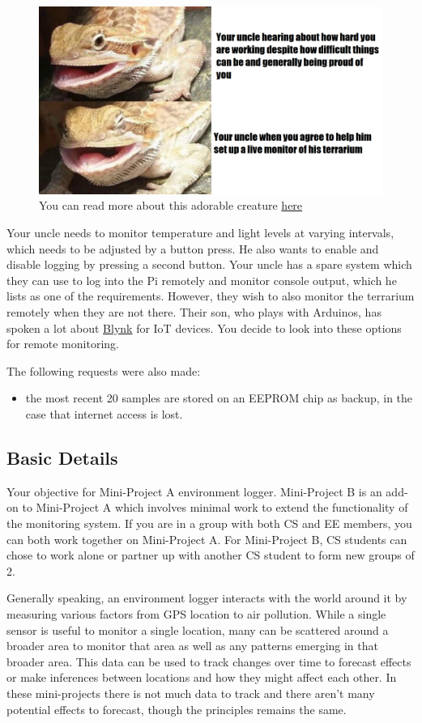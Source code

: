 \begin{figure}[H]
\centering
\includegraphics[width=0.7\columnwidth]{Figures/uncledragon.png}
\caption{You can read more about this adorable creature \href{https://knowyourmeme.com/memes/butter-the-bearded-dragon}{here}}
\label{ButterDragon}
\end{figure}

Your uncle needs to monitor temperature and light levels at varying intervals, which needs to be adjusted by a button press. He also wants to enable and disable logging by pressing a second button. Your uncle has a spare system which they can use to log into the Pi remotely and monitor console output, which he lists as one of the requirements. However, they wish to also monitor the terrarium remotely when they are not there. Their son, who plays with Arduinos, has spoken a lot about \href{https://blynk.io/}{Blynk} for IoT devices. You decide to look into these options for remote monitoring. 

The following requests were also made:
\begin{itemize}
    \item the most recent 20 samples are stored on an EEPROM chip as backup, in the case that internet access is lost.
\end{itemize}


\subsection{Basic Details}
Your objective for Mini-Project A environment logger. Mini-Project B is an add-on to Mini-Project A which involves minimal work to extend the functionality of the monitoring system. If you are in a group with both CS and EE members, you can both work together on Mini-Project A. For Mini-Project B, CS students can chose to work alone or partner up with another CS student to form new groups of 2.

Generally speaking, an environment logger interacts with the world around it by measuring various factors from GPS location to air pollution. While a single sensor is useful to monitor a single location, many can be scattered around a broader area to monitor that area as well as any patterns emerging in that broader area. This data can be used to track changes over time to forecast effects or make inferences between locations and how they might affect each other. In these mini-projects there is not much data to track and there aren't many potential effects to forecast, though the principles remains the same.

